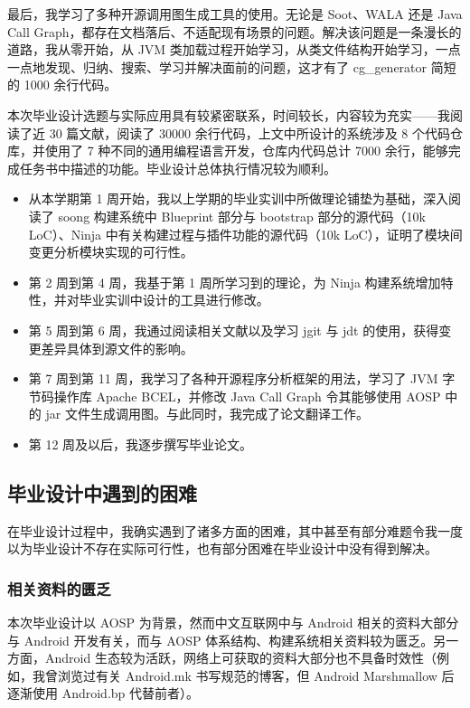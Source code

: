 最后，我学习了多种开源调用图生成工具的使用。无论是 Soot、WALA 还是 Java Call Graph，都存在文档落后、不适配现有场景的问题。解决该问题是一条漫长的道路，我从零开始，从 JVM 类加载过程开始学习，从类文件结构开始学习，一点一点地发现、归纳、搜索、学习并解决面前的问题，这才有了 cg\_generator 简短的 1000 余行代码。

本次毕业设计选题与实际应用具有较紧密联系，时间较长，内容较为充实——我阅读了近 30 篇文献，阅读了 30000 余行代码，上文中所设计的系统涉及 8 个代码仓库，并使用了 7 种不同的通用编程语言开发，仓库内代码总计 7000 余行，能够完成任务书中描述的功能。毕业设计总体执行情况较为顺利。

\begin{itemize}
    \item 从本学期第 1 周开始，我以上学期的毕业实训中所做理论铺垫为基础，深入阅读了 soong 构建系统中 Blueprint 部分与 bootstrap 部分的源代码（10k LoC）、Ninja 中有关构建过程与插件功能的源代码（10k LoC），证明了模块间变更分析模块实现的可行性。
    \item 第 2 周到第 4 周，我基于第 1 周所学习到的理论，为 Ninja 构建系统增加特性，并对毕业实训中设计的工具进行修改。
    \item 第 5 周到第 6 周，我通过阅读相关文献以及学习 jgit 与 jdt 的使用，获得变更差异具体到源文件的影响。
    \item 第 7 周到第 11 周，我学习了各种开源程序分析框架的用法，学习了 JVM 字节码操作库 Apache BCEL，并修改 Java Call Graph 令其能够使用 AOSP 中的 jar 文件生成调用图。与此同时，我完成了论文翻译工作。
    \item 第 12 周及以后，我逐步撰写毕业论文。
\end{itemize}

\subsection{毕业设计中遇到的困难}

在毕业设计过程中，我确实遇到了诸多方面的困难，其中甚至有部分难题令我一度以为毕业设计不存在实际可行性，也有部分困难在毕业设计中没有得到解决。

\subsubsection{相关资料的匮乏}

本次毕业设计以 AOSP 为背景，然而中文互联网中与 Android 相关的资料大部分与 Android 开发有关，而与 AOSP 体系结构、构建系统相关资料较为匮乏。另一方面，Android 生态较为活跃，网络上可获取的资料大部分也不具备时效性（例如，我曾浏览过有关 Android.mk 书写规范的博客，但 Android Marshmallow 后逐渐使用 Android.bp 代替前者）。

